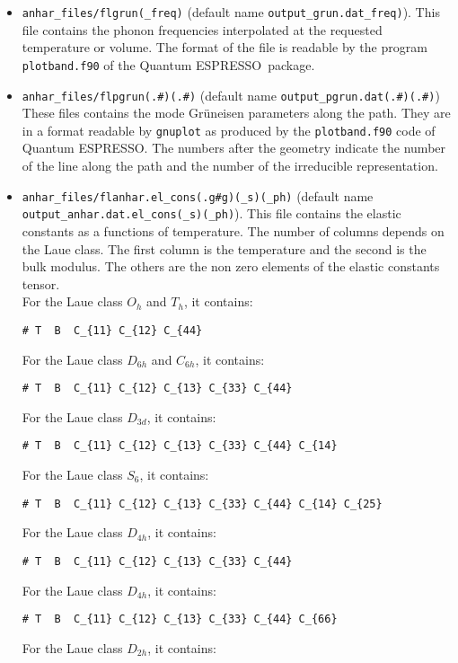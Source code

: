 \documentclass[12pt,a4paper]{article}
\def\qe{{\sc Quantum ESPRESSO}}
\begin{document}
\begin{itemize}
\item 
\texttt{anhar\_files/flgrun(\_freq)} 
(default name \texttt{output\_grun.dat\_freq)}).
This file contains the phonon frequencies interpolated at the requested 
temperature or volume. The format of the file is readable by the program
\texttt{plotband.f90} of the \qe\ package.

\item 
\texttt{anhar\_files/flpgrun(.\#)(.\#)} 
(default name \texttt{output\_pgrun.dat(.\#)(.\#)})
These files contains the mode Gr\"uneisen parameters along the path.
They are in a format readable by \texttt{gnuplot} as produced by 
the \texttt{plotband.f90} code of \qe. The numbers after the geometry indicate the number of the line 
along the path and the number of the irreducible representation.

\item
\texttt{anhar\_files/flanhar.el\_cons(.g\#g)(\_s)(\_ph)}
(default name \texttt{output\_anhar.dat.el\_cons(\_s)(\_ph)}). This file
contains the elastic constants as a functions of temperature. The number
of columns depends on the Laue class. The first column is the 
temperature and the second is the bulk modulus. The others are the
non zero elements of the elastic constants tensor. \\ 
For the Laue class $O_h$ and $T_h$, it contains:
\begin{verbatim}
# T  B  C_{11} C_{12} C_{44}   
\end{verbatim}
For the Laue class $D_{6h}$ and $C_{6h}$, it contains:
\begin{verbatim}
# T  B  C_{11} C_{12} C_{13} C_{33} C_{44}  
\end{verbatim}
For the Laue class $D_{3d}$, it contains:
\begin{verbatim}
# T  B  C_{11} C_{12} C_{13} C_{33} C_{44} C_{14}  
\end{verbatim}
For the Laue class $S_{6}$, it contains:
\begin{verbatim}
# T  B  C_{11} C_{12} C_{13} C_{33} C_{44} C_{14} C_{25}  
\end{verbatim}
For the Laue class $D_{4h}$, it contains:
\begin{verbatim}
# T  B  C_{11} C_{12} C_{13} C_{33} C_{44}  
\end{verbatim}
For the Laue class $D_{4h}$, it contains:
\begin{verbatim}
# T  B  C_{11} C_{12} C_{13} C_{33} C_{44} C_{66} 
\end{verbatim}
For the Laue class $D_{2h}$, it contains:
\begin{verbatim}

\end{verbatim}
\end{itemize}
\end{document}

